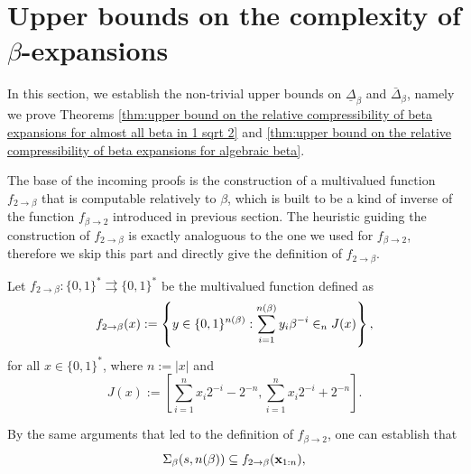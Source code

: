 
\section{\texorpdfstring{Upper bounds on the complexity of $\beta$-expansions}{}}

\label{sec:upper bound on the complexity of beta expansions}

In this section, we establish the non-trivial upper bounds on $\underline \Delta_\beta$ and $\bar \Delta_\beta$, namely we prove Theorems \ref{thm:upper bound on the relative compressibility of beta expansions for almost all beta in 1 sqrt 2} and \ref{thm:upper bound on the relative compressibility of beta expansions for algebraic beta}. 

The base of the incoming proofs is the construction of a multivalued function $f_{2 \to \beta}$ that is computable relatively to $\beta$, which is built to be a kind of inverse of the function $f_{\beta \to 2}$ introduced in previous section. The heuristic guiding the construction of $f_{2 \to \beta}$ is exactly analoguous to the one we used for $f_{\beta \to 2}$, therefore we skip this part and directly give the definition of $f_{2 \to \beta}$.
\begin{definition}\label{def:multivalued function converting from base 2 to base beta}
    Let $f_{2 \to\beta} : \{0,1\}^\ast \rightrightarrows \{0,1\}^\ast$ be the multivalued function defined as 
\begin{equation}\label{eq:main:def:multivalued function converting from base 2 to base beta}
    f_{2 \to \beta}(x) := \left\{ y \in \{0,1\}^{n(\beta)} :  \sum_{i=1}^{n(\beta)} y_i \beta^{-i} \in_n J(x)\right\},
\end{equation}
for all $x \in \{0,1\}^\ast$, where $n := |x|$ and
\begin{equation}\label{eq:J x:def:multivalued function converting from base 2 to base beta}
    J(x) := \left[\sum_{i=1}^{n} x_i 2^{-i} - 2^{-n},  \sum_{i=1}^{n} x_i 2^{-i}+ 2^{-n} \right].
\end{equation}
\end{definition}
\noindent By the same arguments that led to the definition of $f_{\beta \to 2}$, one can establish that
\begin{equation}\label{eq:multivalued function converting from base 2 to base beta is a supset of the beta prefixes}
    \Sigma_\beta(s,n(\beta)) \subseteq f_{2 \to \beta}({\bf x}_{1:n}),
\end{equation}
